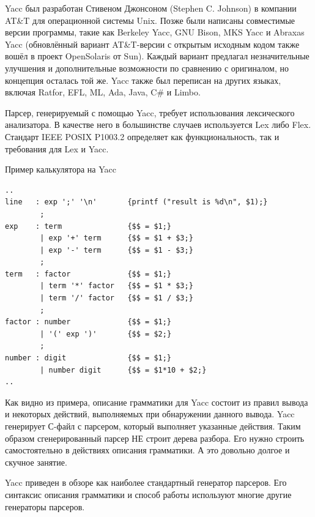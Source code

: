 \documentclass[a4paper,12pt,titlepage]{extarticle}
\begin{document}
Yacc был разработан Стивеном Джонсоном (Stephen C. Johnson) в компании AT\&T
для операционной системы Unix. Позже были написаны совместимые версии
программы, такие как Berkeley Yacc, GNU Bison, MKS Yacc и Abraxas Yacc
(обновлённый вариант AT\&T-версии с открытым исходным кодом также вошёл в
проект OpenSolaris от Sun). Каждый вариант предлагал незначительные улучшения и
дополнительные возможности по сравнению с оригиналом, но концепция осталась той
же. Yacc также был переписан на других языках, включая Ratfor, EFL, ML, Ada,
Java, C\# и Limbo.

Парсер, генерируемый с помощью Yacc, требует использования лексического
анализатора. В качестве него в большинстве случаев используется Lex либо
Flex. Стандарт IEEE POSIX P1003.2 определяет как функциональность, так и
требования для Lex и Yacc.

Пример калькулятора на Yacc
\begin{verbatim}
..
line   : exp ';' '\n'       {printf ("result is %d\n", $1);}
        ;
exp    : term               {$$ = $1;}
        | exp '+' term      {$$ = $1 + $3;}
        | exp '-' term      {$$ = $1 - $3;}
        ;
term   : factor             {$$ = $1;}
        | term '*' factor   {$$ = $1 * $3;}
        | term '/' factor   {$$ = $1 / $3;}
        ;
factor : number             {$$ = $1;}
        | '(' exp ')'       {$$ = $2;}
        ;
number : digit              {$$ = $1;}
        | number digit      {$$ = $1*10 + $2;}
..
\end{verbatim}

Как видно из примера, описание грамматики для Yacc состоит из правил вывода и
некоторых действий, выполняемых при обнаружении данного вывода.
Yacc генерирует С-файл с парсером, который выполняет указанные действия.
Таким образом сгенерированный парсер НЕ строит дерева разбора. Его нужно строить
самостоятельно в действиях описания грамматики. А это довольно долгое и скучное
занятие.

Yacc приведен в обзоре как наиболее стандартный генератор парсеров.
Его синтаксис описания грамматики и способ работы используют многие другие
генераторы парсеров.
\end{document}
